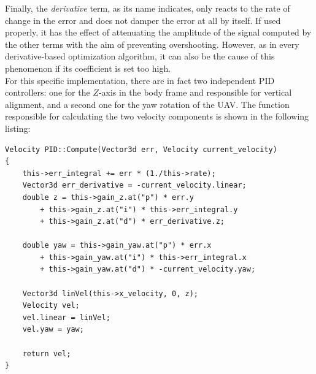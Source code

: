 Finally, the \emph{derivative} term, as its name indicates, only reacts to the
rate of change in the error and does not damper the error at all by itself.
If used properly, it has the effect of attenuating the amplitude of the signal
computed by the other terms with the aim of preventing overshooting. However,
as in every derivative-based optimization algorithm, it can also be the cause
of this phenomenon if its coefficient is set too high.\\

For this specific implementation, there are in fact two independent PID
controllers: one for the $Z$-axis in the body frame and responsible for
vertical alignment, and a second one for the yaw rotation of the UAV. The
function responsible for calculating the two velocity components is shown in
the following listing:

\begin{lstlisting} 
Velocity PID::Compute(Vector3d err, Velocity current_velocity)
{
	this->err_integral += err * (1./this->rate);
	Vector3d err_derivative = -current_velocity.linear;
	double z = this->gain_z.at("p") * err.y
		+ this->gain_z.at("i") * this->err_integral.y
		+ this->gain_z.at("d") * err_derivative.z;

	double yaw = this->gain_yaw.at("p") * err.x
		+ this->gain_yaw.at("i") * this->err_integral.x
		+ this->gain_yaw.at("d") * -current_velocity.yaw;

	Vector3d linVel(this->x_velocity, 0, z);
	Velocity vel;
	vel.linear = linVel;
	vel.yaw = yaw;

	return vel;
}
\end{lstlisting}
